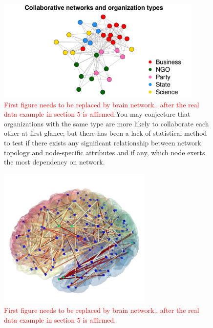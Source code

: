 \documentclass[11pt]{article}
\theoremstyle{definition}
\begin{document}
 \begin{figure}[ht]
 	\centering
 	\includegraphics[width=4in]{introplot.pdf}	
 	\caption{\textcolor{red}{First figure needs to be replaced by brain network.. after the real data example in section 5 is affirmed.}You may conjecture that organizations with the same type are more likely to collaborate each other at first glance; but there has been a lack of statistical method to test if there exists any significant relationship between network topology and node-specific attributes and if any, which node exerts the most dependency on network.}
 	\label{fig:intro}
 \end{figure}
 \begin{figure}[ht]
 	\centering
 	\includegraphics[width=3in]{Brain_networks.jpg}	
 	\caption{\textcolor{red}{First figure needs to be replaced by brain network.. after the real data example in section 5 is affirmed.}}
 \end{figure}
 
\end{document}
